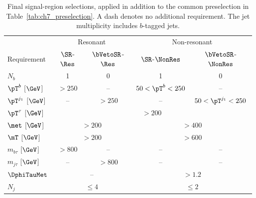 \begin{table}[htbp]
    \centering
    \small
    \caption{Final signal-region selections, applied in addition to the common preselection in Table~\ref{tab:ch7_preselection}. A dash denotes no additional requirement. The jet multiplicity includes $b$-tagged jets.}
    \label{tab:ch7_signal_regions}
    \begin{tabular}{lcccc}
        \toprule
        & \multicolumn{2}{c}{Resonant} & \multicolumn{2}{c}{Non-resonant} \\
        Requirement & $\SR$-$\Res$ & $\bVetoSR$-$\Res$ & $\SR$-$\NonRes$ & $\bVetoSR$-$\NonRes$ \\
        \midrule
        $N_b$ & 1 & 0 & 1 & 0 \\
        $\pT^b$ [$\GeV$] & $>250$ & -- & $50<\pT^b<250$ & -- \\
        $\pT^{j_1}$ [$\GeV$] & -- & $>250$ & -- & $50<\pT^{j_1}<250$ \\
        $\pT^\tau$ [$\GeV$] & \multicolumn{4}{c}{$>200$} \\
        $\met$ [$\GeV$] & \multicolumn{2}{c}{$>200$} & \multicolumn{2}{c}{$>400$} \\
        $\mT$ [$\GeV$] & \multicolumn{2}{c}{$>200$} & \multicolumn{2}{c}{$>600$} \\
        $m_{b\tau}$ [$\GeV$] & $>800$ & -- & -- & -- \\
        $m_{j\tau}$ [$\GeV$] & -- & $>800$ & -- & -- \\
        $\DphiTauMet$ & \multicolumn{2}{c}{--} & \multicolumn{2}{c}{$>1.2$} \\
        $N_j$ & \multicolumn{2}{c}{$\leq4$} & \multicolumn{2}{c}{$\leq2$} \\
        \bottomrule
    \end{tabular}
\end{table}
